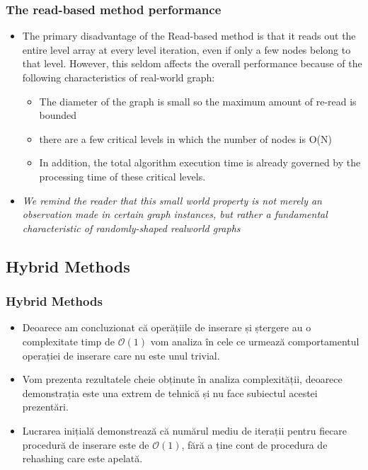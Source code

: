 \documentclass{beamer}
\begin{document}
\begin{frame}
\frametitle{The read-based method performance}

\begin{itemize}
\item The primary disadvantage of the Read-based method is that it reads out the entire level array at every level iteration, even if only a few nodes belong to that level. However, this seldom affects the overall performance because of the following characteristics of real-world graph:
	\begin{itemize}
		\item The
diameter of the graph is small so the maximum amount of
re-read is bounded
		\item there are a few critical levels in
which the number of nodes is O(N)
		\item In addition, the total algorithm execution time
is already governed by the processing time of these critical
levels.
	\end{itemize}
\item \textit{We remind the reader that this small world property is
not merely an observation made in certain graph instances, but
rather a fundamental characteristic of randomly-shaped realworld
graphs}
\end{itemize}

\end{frame}
\begin{frame}
\section{Hybrid Methods}
\frametitle{Hybrid Methods}
\begin{itemize}
\item Deoarece am concluzionat că operățiile de inserare și ștergere au o complexitate timp de $\mathcal{O}(1)$ vom analiza în cele ce urmează comportamentul operației de inserare care nu este unul trivial.

\item Vom prezenta rezultatele cheie obținute în analiza complexității, deoarece demonstrația este una extrem de tehnică și nu face subiectul acestei prezentări.

\item Lucrarea inițială demonstrează că numărul mediu de iterații pentru fiecare procedură de inserare este de $\mathcal{O}(1)$, fără a ține cont de procedura de rehashing care este apelată.

\end{itemize}
\end{frame}
\end{document}
